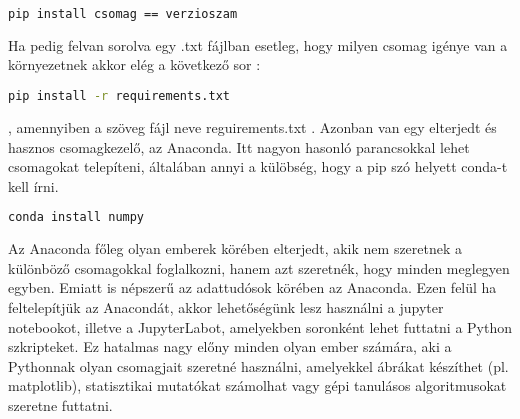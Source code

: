 \documentclass{article}
\theoremstyle{definition}
\theoremstyle{theorem}
\begin{document}
    \begin{lstlisting}[language=bash]
  pip install csomag == verzioszam
\end{lstlisting}
Ha pedig felvan sorolva egy .txt fájlban esetleg, hogy milyen csomag igénye van a környezetnek akkor elég a következő sor :
\begin{lstlisting}[language=bash]
pip install -r requirements.txt
\end{lstlisting}
, amennyiben a szöveg fájl neve reguirements.txt . \newline
Azonban van egy elterjedt és hasznos csomagkezelő, az Anaconda. Itt nagyon hasonló parancsokkal lehet csomagokat telepíteni, általában\cite{Anaconda} annyi a külöbség, hogy a pip szó helyett conda-t kell írni.
\begin{lstlisting}[language=bash]
conda install numpy
\end{lstlisting}
Az Anaconda főleg olyan emberek körében elterjedt, akik nem szeretnek a különböző csomagokkal foglalkozni, hanem azt szeretnék, hogy minden meglegyen egyben. Emiatt is népszerű az adattudósok körében az Anaconda. Ezen felül ha feltelepítjük az Anacondát, akkor lehetőségünk lesz használni a jupyter notebookot, illetve a JupyterLabot, amelyekben soronként lehet futtatni a Python szkripteket. Ez hatalmas nagy előny minden olyan ember számára, aki a Pythonnak olyan csomagjait szeretné használni, amelyekkel ábrákat készíthet (pl. matplotlib), statisztikai mutatókat számolhat vagy gépi tanulásos algoritmusokat szeretne futtatni.
\end{document}
